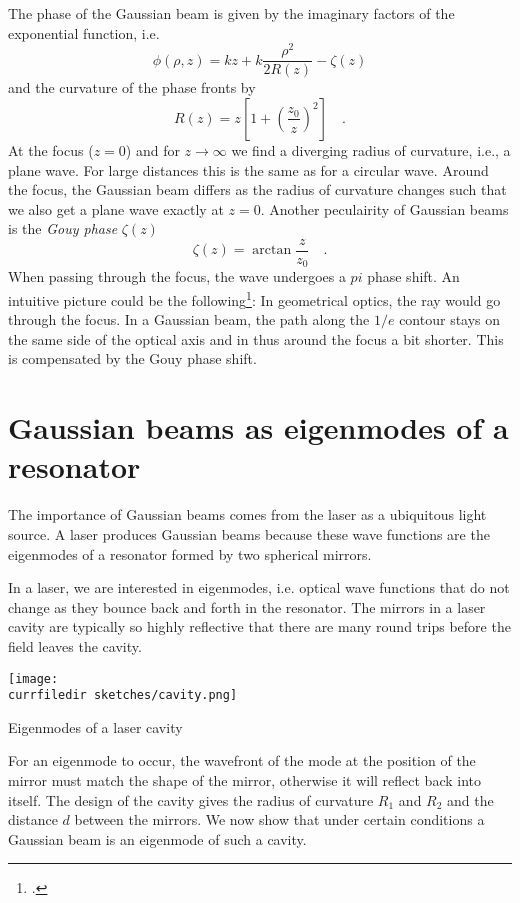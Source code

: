 The phase of the Gaussian beam is given by the imaginary factors of the exponential function, i.e.
\begin{equation}
    \phi(\rho, z) = k z + k  \frac{\rho^2}{2 R(z)}  -  \zeta(z) 
\end{equation}
and the curvature of the phase fronts by 
\begin{equation}
    R(z) = z \left[ 1 + \left( \frac{z_0}{z} \right)^2 \right]  \quad .
\end{equation}
At the focus ($z=0$) and for $z \rightarrow \infty$ we find a diverging radius of curvature, i.e., a plane wave. For large distances this is the same as for a circular wave. Around the focus, the Gaussian beam differs as the radius of curvature changes such that we also get a plane wave exactly at $z=0$. Another peculairity of Gaussian beams is the \emph{Gouy phase} $\zeta(z)$
\begin{equation}
    \zeta(z) =  \arctan \frac{z}{z_0}  \quad .
\end{equation}
When passing through the focus, the wave undergoes a $pi$ phase shift. An intuitive picture could be the following\footcite{Boyd1980IntuitiveEO}: In geometrical optics, the ray would go through the focus. In a Gaussian beam, the path along the $1/e$ contour stays on the same side of the optical axis and in thus around the focus a bit shorter. This is compensated by the Gouy phase shift.




\section{Gaussian beams as eigenmodes of a resonator}
The importance of Gaussian beams comes from the laser as a ubiquitous light source. A laser produces Gaussian beams because these wave functions are the eigenmodes of a resonator formed by two spherical mirrors.

In a laser, we are interested in eigenmodes, i.e. optical wave functions that do not change as they bounce back and forth in the resonator. The mirrors in a laser cavity are typically so highly reflective that there are many round trips before the field leaves the cavity.


\begin{marginfigure}
    \texttt{[image: \\currfiledir sketches/cavity.png]}
   \caption{Eigenmodes of a laser cavity}
\end{marginfigure}


For an eigenmode to occur, the wavefront of the mode at the position of the mirror must match the shape of the mirror, otherwise it will reflect back into itself. The design of the cavity gives the radius of curvature $R_1$ and $R_2$ and the distance $d$ between the mirrors. We now show that under certain conditions a Gaussian beam is an eigenmode of such a cavity.

